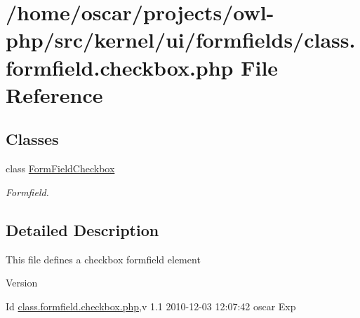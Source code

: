 \section{/home/oscar/projects/owl-\/php/src/kernel/ui/formfields/class.formfield.checkbox.php File Reference}
\label{class_8formfield_8checkbox_8php}
\subsection*{Classes}
\begin{DoxyCompactItemize}
\item 
class \hyperlink{classFormFieldCheckbox}{FormFieldCheckbox}
\begin{DoxyCompactList}\small\item\em Formfield. \item\end{DoxyCompactList}\end{DoxyCompactItemize}


\subsection{Detailed Description}
This file defines a checkbox formfield element \begin{DoxyVersion}{Version}

\end{DoxyVersion}
\begin{DoxyParagraph}{Id}
\hyperlink{class_8formfield_8checkbox_8php}{class.formfield.checkbox.php},v 1.1 2010-\/12-\/03 12:07:42 oscar Exp 
\end{DoxyParagraph}
